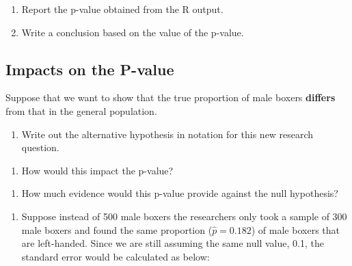 \documentclass[
]{report}
\providecommand{\tightlist}{%
  \setlength{\itemsep}{0pt}\setlength{\parskip}{0pt}}
\begin{document}
\begin{enumerate}
\def\labelenumi{\arabic{enumi}.}
\setcounter{enumi}{10}
\item
  Report the p-value obtained from the R output.
  \vspace{0.3in}
\item
  Write a conclusion based on the value of the p-value.
  \newpage
\end{enumerate}

\hypertarget{impacts-on-the-p-value}{%
\subsection*{Impacts on the P-value}\label{impacts-on-the-p-value}}

Suppose that we want to show that the true proportion of male boxers \textbf{differs} from that in the general population.

\begin{enumerate}
\def\labelenumi{\arabic{enumi}.}
\setcounter{enumi}{12}
\tightlist
\item
  Write out the alternative hypothesis in notation for this new research question.
\end{enumerate}

\vspace{0.5in}

\begin{enumerate}
\def\labelenumi{\arabic{enumi}.}
\setcounter{enumi}{13}
\tightlist
\item
  How would this impact the p-value?
\end{enumerate}

\vspace{0.2in}

\begin{enumerate}
\def\labelenumi{\arabic{enumi}.}
\setcounter{enumi}{14}
\tightlist
\item
  How much evidence would this p-value provide against the null hypothesis?
\end{enumerate}

\vspace{0.3in}

\begin{enumerate}
\def\labelenumi{\arabic{enumi}.}
\setcounter{enumi}{15}
\tightlist
\item
  Suppose instead of 500 male boxers the researchers only took a sample of 300 male boxers and found the same proportion (\(\hat{p}=0.182\)) of male boxers that are left-handed. Since we are still assuming the same null value, 0.1, the standard error would be calculated as below:
\end{enumerate}
\end{document}
